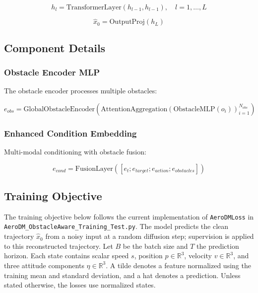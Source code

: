 \documentclass[12pt]{article}
\begin{document}
\begin{equation}
h_l = \text{TransformerLayer}(h_{l-1}, h_{l-1}), \quad l=1,\dots,L
\end{equation}

\begin{equation}
\hat{x}_0 = \text{OutputProj}(h_L)
\end{equation}

\subsection{Component Details}

\subsubsection{Obstacle Encoder MLP}

The obstacle encoder processes multiple obstacles:

\begin{equation}
e_{obs} = \text{GlobalObstacleEncoder}\left(\text{AttentionAggregation}\left(\text{ObstacleMLP}(o_i)\right)_{i=1}^{N_{obs}}\right)
\end{equation}

\subsubsection{Enhanced Condition Embedding}

Multi-modal conditioning with obstacle fusion:

\begin{equation}
e_{cond} = \text{FusionLayer}([e_t; e_{target}; e_{action}; e_{obstacles}])
\end{equation}

\subsection{Training Objective}
\label{sec:training-objective}

The training objective below follows the current implementation of
\texttt{AeroDMLoss} in \texttt{AeroDM\_ObstacleAware\_Training\_Test.py}.
The model predicts the clean trajectory $\hat{x}_0$ from a noisy input at a
random diffusion step; supervision is applied to this reconstructed trajectory.
Let $B$ be the batch size and $T$ the prediction horizon. Each state contains
scalar speed $s$, position $p\in\mathbb{R}^3$, velocity $v\in\mathbb{R}^3$,
and three attitude components $\eta\in\mathbb{R}^3$. A tilde denotes a
feature normalized using the training mean and standard deviation, and a hat
denotes a prediction. Unless stated otherwise, the losses use normalized states.
\end{document}
